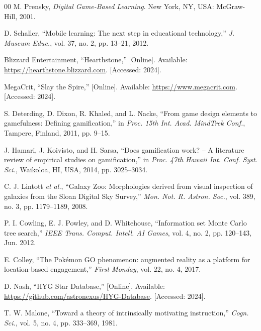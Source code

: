 \documentclass[conference]{IEEEtran}
\begin{document}
\begin{thebibliography}{00}
M. Prensky, \textit{Digital Game-Based Learning}. New York, NY, USA: McGraw-Hill, 2001.

D. Schaller, ``Mobile learning: The next step in educational technology,'' \textit{J. Museum Educ.}, vol. 37, no. 2, pp. 13--21, 2012.

Blizzard Entertainment, ``Hearthstone,'' [Online]. Available: \url{https://hearthstone.blizzard.com}. [Accessed: 2024].

MegaCrit, ``Slay the Spire,'' [Online]. Available: \url{https://www.megacrit.com}. [Accessed: 2024].

S. Deterding, D. Dixon, R. Khaled, and L. Nacke, ``From game design elements to gamefulness: Defining gamification,'' in \textit{Proc. 15th Int. Acad. MindTrek Conf.}, Tampere, Finland, 2011, pp. 9--15.

J. Hamari, J. Koivisto, and H. Sarsa, ``Does gamification work? -- A literature review of empirical studies on gamification,'' in \textit{Proc. 47th Hawaii Int. Conf. Syst. Sci.}, Waikoloa, HI, USA, 2014, pp. 3025--3034.

C. J. Lintott \textit{et al.}, ``Galaxy Zoo: Morphologies derived from visual inspection of galaxies from the Sloan Digital Sky Survey,'' \textit{Mon. Not. R. Astron. Soc.}, vol. 389, no. 3, pp. 1179--1189, 2008.

P. I. Cowling, E. J. Powley, and D. Whitehouse, ``Information set Monte Carlo tree search,'' \textit{IEEE Trans. Comput. Intell. AI Games}, vol. 4, no. 2, pp. 120--143, Jun. 2012.

E. Colley, ``The Pok\'{e}mon GO phenomenon: augmented reality as a platform for location-based engagement,'' \textit{First Monday}, vol. 22, no. 4, 2017.

D. Nash, ``HYG Star Database,'' [Online]. Available: \url{https://github.com/astronexus/HYG-Database}. [Accessed: 2024].

T. W. Malone, ``Toward a theory of intrinsically motivating instruction,'' \textit{Cogn. Sci.}, vol. 5, no. 4, pp. 333--369, 1981.

\end{thebibliography}
\end{document}

